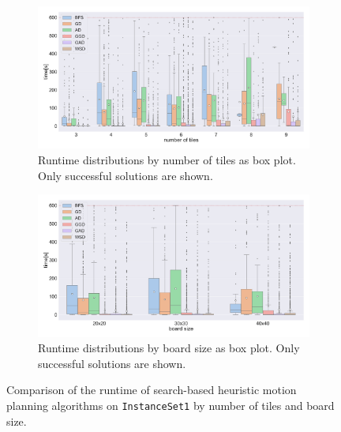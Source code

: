 \begin{figure}[H]
\centering
\begin{subfigure}[b]{\textwidth}
\centering
\includegraphics[width=\textwidth]{figures/plots/heuristic_solvers_i1/hs_i1_time_over_tiles.pdf}
\caption{Runtime distributions by number of tiles as box plot. Only successful solutions are shown.}
\label{fig:hs_i1_time_over_tiles}
\end{subfigure}
\begin{subfigure}[b]{\textwidth}
\centering
\includegraphics[width=\textwidth]{figures/plots/heuristic_solvers_i1/hs_i1_time_over_board_size.pdf}
\caption{Runtime distributions by board size as box plot. Only successful solutions are shown.}
\label{fig:hs_i1_time_over_board_size}
\end{subfigure}
\caption[Runtime of the search-based heuristic planners on \texttt{InstanceSet1}]{Comparison of the runtime of search-based heuristic motion planning algorithms on \texttt{InstanceSet1} by number of tiles and board size.}
\label{fig:hs_i1_performance1}
\end{figure}
